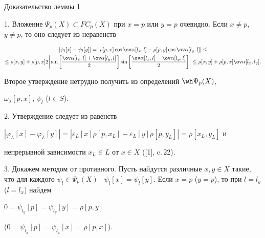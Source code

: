 \begin{pf*}{Доказательство леммы 1}


1. Вложение $\Psi_{p}(X) \subset


FC_{p}(X)$ при $x = p$ или $y = p$ очевидно. Если $x \neq p$, $y


\neq p$, то оно следует из неравенств


\begin{gather*}


|\psi_{l}[x] - \psi_{l}[y]| = |\rho[p,x]\cos \ov \alpha[l_{x},l] -


\rho[p,y]\cos \ov \alpha[l_{y},l]| \leq \\


\le \rho[x,y] + \rho[p,x]2\bigg|\sin\bigg[\frac{\ov \alpha[l_{x},l] +


\ov \alpha[l_{y},l]}{2}\bigg]


\sin\bigg[\frac{\ov \alpha[l_{x},l] - \ov \alpha[l_{y},l]}{2}\bigg]\bigg|


\leq\rho[x,y] + \rho[p,x]\ov \alpha[l_{x},l_{y}].


\end{gather*}


Второе утверждение нетрудно получить из определений $\wh \Psi_{p}(X)$,


$\omega_{\lambda}[p,x]$, $\psi _{l}$ ($l \in S$).


\smallskip





2. Утверждение следует из равенств


$|\varphi _{L}[x] - \varphi _{L}[y]| = |\varepsilon_{L}[x] \rho[p,x_{L}] -


\varepsilon_{L}[y] \rho[p,y_{L}]|= \rho[x_{L},y_{L}]$ и


непрерывной зависимости $x_{L} \in L$ от $x \in X$ ([1], c.\,22).


\smallskip





3. Докажем методом от противного. Пусть найдутся различные $x, y


\in X$ такие, что для каждого $\psi _{l} \in \Psi _{p}(X)$ \ $\psi


_{l}[x] = \psi _{l}[y]$. Если $x = p$ ($y = p$), то при $l =


l_{y}$ ($l = l_{x}$) найдем


$0 = \psi _{l_{y}}[p] =  \psi _{l_{y}}[y] = \rho[p,y]$


($0 = \psi _{l_{x}}[p] =  \psi _{l_{x}}[x] = \rho[p,x]$).



\end{pf*}
